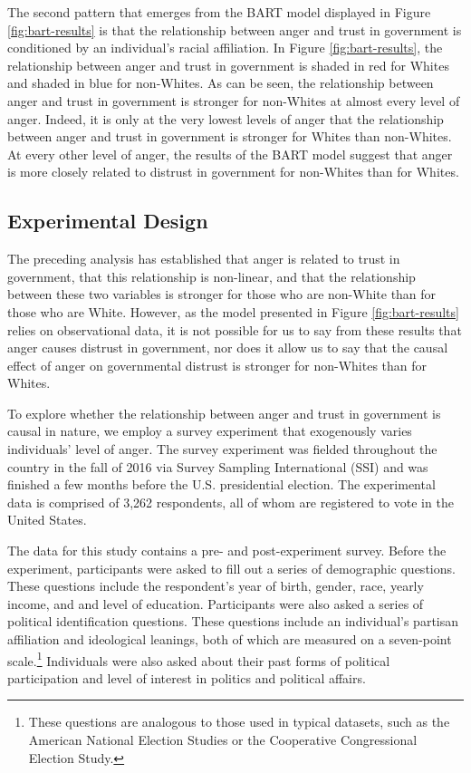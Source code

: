 \documentclass[12pt, letterpaper]{article}
\begin{document}
The second pattern that emerges from the BART model displayed in Figure \ref{fig:bart-results} is that the relationship between anger and trust in government is conditioned by an individual's racial affiliation. In Figure \ref{fig:bart-results}, the relationship between anger and trust in government is shaded in red for Whites and shaded in blue for non-Whites. As can be seen, the relationship between anger and trust in government is stronger for non-Whites at almost every level of anger. Indeed, it is only at the very lowest levels of anger that the relationship between anger and trust in government is stronger for Whites than non-Whites. At every other level of anger, the results of the BART model suggest that anger is more closely related to distrust in government for non-Whites than for Whites.

\subsection{Experimental Design}
\label{subsec:experiment}

The preceding analysis has established that anger is related to trust in government, that this relationship is non-linear, and that the relationship between these two variables is stronger for those who are non-White than for those who are White. However, as the model presented in Figure \ref{fig:bart-results} relies on observational data, it is not possible for us to say from these results that anger causes distrust in government, nor does it allow us to say that the causal effect of anger on governmental distrust is stronger for non-Whites than for Whites.

To explore whether the relationship between anger and trust in government is causal in nature, we employ a survey experiment that exogenously varies individuals' level of anger. The survey experiment was fielded throughout the country in the fall of 2016 via Survey Sampling International (SSI) and was finished a few months before the U.S. presidential election. The experimental data is comprised of 3,262 respondents, all of whom are registered to vote in the United States. 

The data for this study contains a pre- and post-experiment survey. Before the experiment, participants were asked to fill out a series of demographic questions. These questions include the respondent's year of birth, gender, race, yearly income, and and level of education. Participants were also asked a series of political identification questions. These questions include an individual's partisan affiliation and ideological leanings, both of which are measured on a seven-point scale.\footnote{These questions are analogous to those used in typical datasets, such as the American National Election Studies or the Cooperative Congressional Election Study.} Individuals were also asked about their past forms of political participation and level of interest in politics and political affairs.
\end{document}
